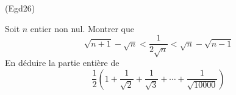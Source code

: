 \begin{tiny}(Egd26)\end{tiny} Soit $n$ entier non nul. Montrer que
\begin{displaymath}
 \sqrt{n+1}-\sqrt{n} < \frac{1}{2\sqrt{n}} < \sqrt{n}-\sqrt{n-1} 
\end{displaymath}
En déduire la partie entière de 
\begin{displaymath}
 \frac{1}{2}\left(1+\frac{1}{\sqrt{2}}+\frac{1}{\sqrt{3}}+\cdots +\frac{1}{\sqrt{10000}}\right) 
\end{displaymath}
 